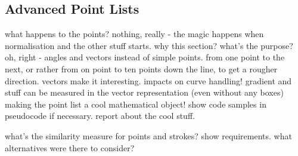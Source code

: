 







\subsection{Advanced Point Lists}
\label{sec:hwre:advancedpointlists}

what happens to the points?
nothing, really - the magic happens when normalisation and the other stuff
starts.
why this section? what's the purpose? oh, right - angles and vectors instead
of simple points. from one point to the next, or rather from on point to
ten points down the line, to get a rougher direction.
vectors make it interesting. 
impacts on curve handling! gradient and stuff can be measured in the 
vector representation (even without any boxes)
making the point list a cool mathematical object!
show code samples in pseudocode if necessary.
report about the cool stuff.

what's the similarity measure for
points and strokes?
show requirements.
what alternatives were there to consider?

